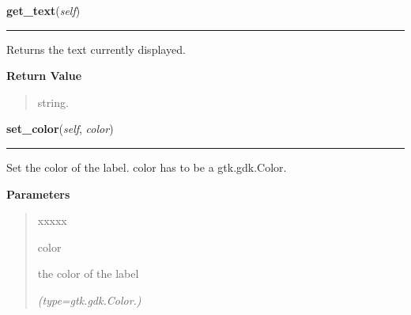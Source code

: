    \vspace{0.5ex}

\hspace{.8\funcindent}\begin{boxedminipage}{\funcwidth}

    \raggedright \textbf{get\_text}(\textit{self})

    \vspace{-1.5ex}

    \rule{\textwidth}{0.5\fboxrule}
\setlength{\parskip}{2ex}
    Returns the text currently displayed.

\setlength{\parskip}{1ex}
      \textbf{Return Value}
    \vspace{-1ex}

      \begin{quote}
      string.

      \end{quote}

    \end{boxedminipage}

    \label{pygtk_chart:label:Label:set_color}

    \vspace{0.5ex}

\hspace{.8\funcindent}\begin{boxedminipage}{\funcwidth}

    \raggedright \textbf{set\_color}(\textit{self}, \textit{color})

    \vspace{-1.5ex}

    \rule{\textwidth}{0.5\fboxrule}
\setlength{\parskip}{2ex}
    Set the color of the label. color has to be a gtk.gdk.Color.

\setlength{\parskip}{1ex}
      \textbf{Parameters}
      \vspace{-1ex}

      \begin{quote}
        \begin{Ventry}{xxxxx}

          \item[color]

          the color of the label

            {\it (type=gtk.gdk.Color.)}

        \end{Ventry}

      \end{quote}

    \end{boxedminipage}

